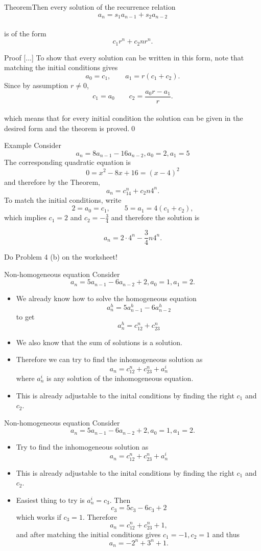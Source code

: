 \documentclass{beamer}
\def\bl[#1]#2{\begin{block}{#1}#2\end{block}}
\def\itemb{\begin{itemize}}
\def\iteme{\end{itemize}}
\begin{document}
\begin{frame}
\bl[Theorem]{Then every solution of the recurrence relation\vspace{-0.2cm}
\[
a_n=s_1a_{n-1}+s_2a_{n-2}
\]\vspace{-0.6cm}\\
is of the form\vspace{-0.2cm}
\[
c_1r^n+c_2nr^n.
\]}
\bl[Proof]{
[...]
To show that every solution can be written in this form, note that matching the initial conditions gives
\[
a_0=c_1,\qquad a_1=r(c_1+c_2).
\]
Since by assumption $r\neq 0$, \vspace{-0.3cm}
\[
c_1=a_0\qquad c_2=\frac{a_0r-a_1}{r}.
\]\vspace{-0.6cm}\\
which means that for every initial condition the solution can be given in the desired form and the theorem is proved.\qed}

\end{frame}

\begin{frame}{Example}
Consider
\[
a_{n}=8a_{n-1}-16a_{n-2}, a_0=2,a_1=5
\]
The corresponding quadratic equation is
\[
0=x^2-8x+16=(x-4)^2
\]
and therefore by the Theorem,
\[
a_n=c_14^n+c_2n4^n.
\]
To match the initial conditions, write
\[
2=a_0=c_1,\qquad 5=a_1=4(c_1+c_2),
\]
which implies $c_1=2$ and $c_2=-\frac{3}{4}$ and therefore the solution is
\bl[]{
\[
a_n=2\cdot 4^n-\frac{3}{4}n4^n.
\]}
\center Do Problem 4 (b) on the worksheet!
\end{frame}

\begin{frame}{Non-homogeneous equation}
Consider 
\[
a_n=5a_{n-1}-6a_{n-2}+2, a_0=1, a_1=2.
\]
\itemb
\item We already know how to solve the homogeneous equation
\[
a_n^h=5a_{n-1}^h-6a_{n-2}^h
\]
to get
\[
a_n^h=c_12^n+c_23^n
\]
\item We also know that the sum of solutions is a solution.
\item Therefore we can try to find the inhomogeneous solution as
\[
a_n=c_12^n+c_23^n+a_n^i
\]
where $a_n^i$ is any solution of the inhomogeneous equation.
\item This is already adjustable to the inital conditions by finding the right $c_1$ and $c_2$.
\iteme
\end{frame}

\begin{frame}{Non-homogeneous equation}
Consider \vspace{-0.3cm}
\[
a_n=5a_{n-1}-6a_{n-2}+2, a_0=1, a_1=2.
\]\vspace{-0.5cm}
\itemb
\item Try to find the inhomogeneous solution as
\[
a_n=c_12^n+c_23^n+a_n^i
\]
\item This is already adjustable to the inital conditions by finding the right $c_1$ and $c_2$.
\item Easiest thing to try is $a_n^{i}=c_3$. Then
\[
c_3=5c_3-6c_3+2
\]
which works if $c_3=1$. Therefore 
\[
a_n=c_12^n+c_23^n+1,
\]
and after matching the initial conditions gives $c_1=-1, c_2=1$ and thus
\[
a_n=-2^n+3^n+1.
\]
\iteme
\end{frame}

\begin{frame}
\end{frame}
\end{document}
